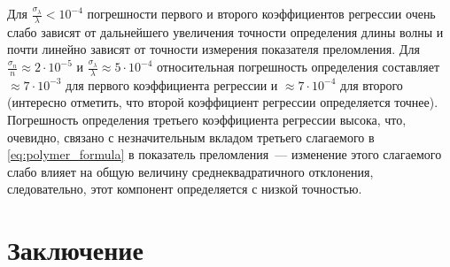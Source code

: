 \documentclass[11pt,a4paper]{article}
\theoremstyle{definition}
\begin{document}
Для $\frac{\sigma_{\lambda}}{\lambda} < 10^{-4}$ погрешности первого и второго коэффициентов
регрессии очень слабо зависят от дальнейшего увеличения точности
определения длины волны и почти линейно зависят от точности измерения
показателя преломления. Для $\frac{\sigma_n}{n} \approx 2 \cdot 10^{-5}$
и $\frac{\sigma_{\lambda}}{\lambda} \approx 5 \cdot 10^{-4}$ относительная
погрешность определения составляет $\approx 7 \cdot 10^{-3}$ для первого коэффициента
регрессии и $\approx 7 \cdot 10^{-4}$ для второго (интересно отметить, что второй
коэффициент регрессии определяется точнее). Погрешность определения
третьего коэффициента регрессии высока, что, очевидно, связано с
незначительным вкладом третьего слагаемого в \eqref{eq:polymer_formula} в показатель преломления~---
изменение этого слагаемого слабо влияет на общую величину
среднеквадратичного отклонения, следовательно, этот компонент определяется с низкой точностью.

\section{Заключение}
\end{document}
